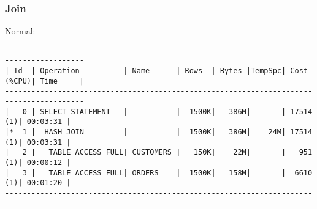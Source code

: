 \documentclass[11pt,a4paper,parskip=half]{scrartcl}
\begin{document}
\subsubsection{Join}
Normal:
\begin{lstlisting}
----------------------------------------------------------------------------------------                                                                                                                                                                                                                     
| Id  | Operation          | Name      | Rows  | Bytes |TempSpc| Cost (%CPU)| Time     |                                                                                                                                                                                                                     
----------------------------------------------------------------------------------------                                                                                                                                                                                                                     
|   0 | SELECT STATEMENT   |           |  1500K|   386M|       | 17514   (1)| 00:03:31 |                                                                                                                                                                                                                     
|*  1 |  HASH JOIN         |           |  1500K|   386M|    24M| 17514   (1)| 00:03:31 |                                                                                                                                                                                                                     
|   2 |   TABLE ACCESS FULL| CUSTOMERS |   150K|    22M|       |   951   (1)| 00:00:12 |                                                                                                                                                                                                                     
|   3 |   TABLE ACCESS FULL| ORDERS    |  1500K|   158M|       |  6610   (1)| 00:01:20 |                                                                                                                                                                                                                     
----------------------------------------------------------------------------------------                                                                                                                                                                                                                     
                                                                                                                                                                                                                                                                                                             

\end{lstlisting}
\end{document}
